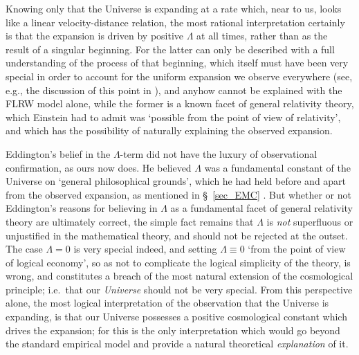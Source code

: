 Knowing only that the Universe is expanding at a rate which, near to us, looks like a linear velocity-distance relation, the most rational interpretation certainly is that the expansion is driven by positive $\Lambda$ at all times, rather than as the result of a singular beginning. For the latter can only be described with a full understanding of the process of that beginning, which itself must have been very special in order to account for the uniform expansion we observe everywhere (see, e.g., the discussion of this point in \cite{Penrose2005,Penrose2009}), and anyhow cannot be explained with the FLRW model alone, while the former is a known facet of general relativity theory, which Einstein had to admit was `possible from the point of view of relativity', and which has the possibility of naturally explaining the observed expansion. 

Eddington's belief in the $\Lambda$-term did not have the luxury of observational confirmation, as ours now does. He believed $\Lambda$ was a fundamental constant of the Universe on `general philosophical grounds', which he had held before and apart from the observed expansion, as mentioned in \S~\ref{sec_EMC} \cite{Eddington1923,Eddington1929,Eddington1931}. But whether or not Eddington's reasons for believing in $\Lambda$ as a fundamental facet of general relativity theory are ultimately correct, the simple fact remains that $\Lambda$ is \textit{not} superfluous or unjustified in the mathematical theory, and should not be rejected at the outset. The case $\Lambda=0$ is very special indeed, and setting $\Lambda\equiv0$ `from the point of view of logical economy', so as not to complicate the logical simplicity of the theory, is wrong, and constitutes a breach of the most natural extension of the cosmological principle; i.e.~that our \textit{Universe} should not be very special. From this perspective alone, the most logical interpretation of the observation that the Universe is expanding, is that our Universe possesses a positive cosmological constant which drives the expansion; for this is the only interpretation which would go beyond the standard empirical model and provide a natural theoretical \textit{explanation} of it.

